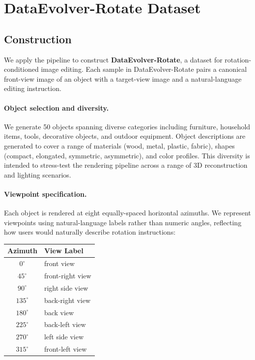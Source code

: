 \section{DataEvolver-Rotate Dataset}
\label{sec:dataset}

\subsection{Construction}
\label{sec:dataset:construction}

We apply the \aris{} pipeline to construct \textbf{DataEvolver-Rotate},
a dataset for rotation-conditioned image editing.
Each sample in DataEvolver-Rotate pairs a canonical front-view image of an object
with a target-view image and a natural-language editing instruction.

\paragraph{Object selection and diversity.}
We generate 50 objects spanning diverse categories including furniture, household items,
tools, decorative objects, and outdoor equipment.
Object descriptions are generated to cover a range of materials (wood, metal, plastic, fabric),
shapes (compact, elongated, symmetric, asymmetric),
and color profiles.
This diversity is intended to stress-test the rendering pipeline
across a range of 3D reconstruction and lighting scenarios.

\paragraph{Viewpoint specification.}
Each object is rendered at eight equally-spaced horizontal azimuths.
We represent viewpoints using natural-language labels rather than numeric angles,
reflecting how users would naturally describe rotation instructions:

\begin{center}
\begin{tabular}{cl}
\toprule
Azimuth & View Label \\
\midrule
$0^\circ$   & front view \\
$45^\circ$  & front-right view \\
$90^\circ$  & right side view \\
$135^\circ$ & back-right view \\
$180^\circ$ & back view \\
$225^\circ$ & back-left view \\
$270^\circ$ & left side view \\
$315^\circ$ & front-left view \\
\bottomrule
\end{tabular}
\end{center}

